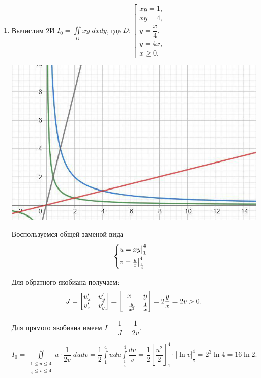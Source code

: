 \documentclass[../../main.tex]{subfiles}
\begin{document}
	\begin{examples}
~

		\begin{enumerate}
			\item
			Вычислим 2И $\displaystyle I_0 = \iint\limits_D xy\; dxdy$, гдe
			$D: \left[
			\begin{array}{l} 
			xy= 1,\\
			xy = 4,\\
			y = \dfrac{x}{4},\\
			y = 4x,\\
			x \geq 0.
			\end{array}
			\right.
			$
			
			\includegraphics[scale=0.85]{lec15_2}
			
			Воспользуемся общей заменой вида
			\[\begin{cases}
			\smallskip
			u = xy \big|_{1}^{4}\\
			v = \frac{y}{x} \big|_{\frac{1}{4}}^{4}
			\end{cases}\]
			
			Для обратного якобиана получаем: 
			\[J = \begin{bmatrix}
			u'_x & u'_y\\
			v'_x & 	v'_y
			\end{bmatrix} = \begin{bmatrix}
			\smallskip
			x & y\\
			-\frac{y}{x^2}& \frac{1}{x}
			\end{bmatrix} = 2 \dfrac{y}{x} = 2 v > 0.\]
			
			Для прямого якобиана имеем $I = \dfrac{1}{J} = \dfrac{1}{2v}$.
			
			$\displaystyle I_0 = \iint\limits_{\substack{
				1 \leq u \leq 4\\
				\frac{1}{4} \leq v \leq 4
				}} u \cdot \dfrac{1}{2v} \; du 
			dv = \dfrac{1}{2}\int\limits_{1}^{4} u du 
			\int\limits_{\frac{1}{4}}^{4} \dfrac{dv}{v} =
			 \dfrac{1}{2} \left[\dfrac{u ^ 2}{2}\right]_1^4 \cdot 
			 \big[ \ln{v}\big]_{\frac{1}{4}}^4 = 2^3 \ln{4} = 16 \ln{2}.$
			 

\end{enumerate}
\end{examples}
\end{document}
